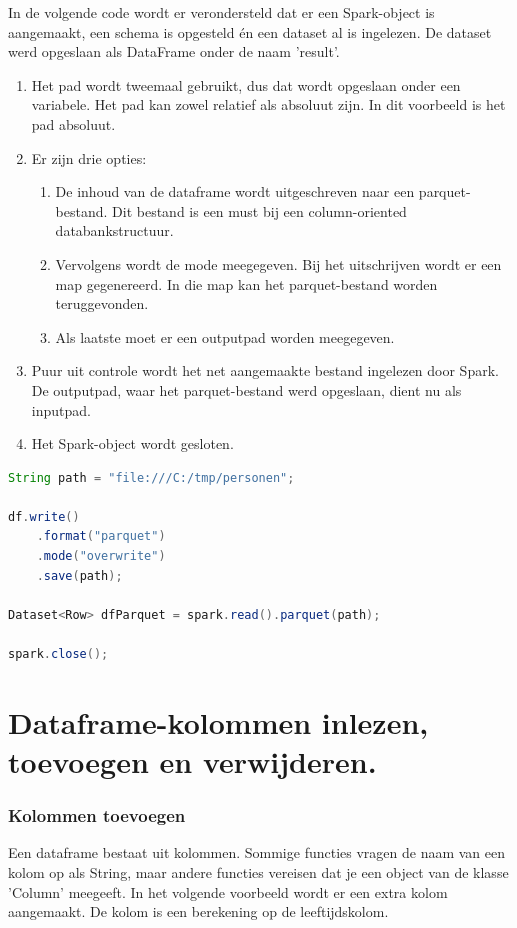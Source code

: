 \documentclass[a4paper,10pt,twoside]{report}
\begin{document}
In de volgende code wordt er verondersteld dat er een Spark-object is aangemaakt, een schema is opgesteld én een dataset al is ingelezen. De dataset werd opgeslaan als DataFrame onder de naam 'result'.

\begin{enumerate}
	\item Het pad wordt tweemaal gebruikt, dus dat wordt opgeslaan onder een variabele. Het pad kan zowel relatief als absoluut zijn. In dit voorbeeld is het pad absoluut.
	\item Er zijn drie opties:
	\begin{enumerate}
		\item De inhoud van de dataframe wordt uitgeschreven naar een parquet-bestand. Dit bestand is een must bij een column-oriented databankstructuur.
		\item Vervolgens wordt de mode meegegeven. Bij het uitschrijven wordt er een map gegenereerd. In die map kan het parquet-bestand worden teruggevonden.
		\item Als laatste moet er een outputpad worden meegegeven. 
	\end{enumerate}
	\item Puur uit controle wordt het net aangemaakte bestand ingelezen door Spark. De outputpad, waar het parquet-bestand werd opgeslaan, dient nu als inputpad.
	\item Het Spark-object wordt gesloten.
\end{enumerate}

\begin{lstlisting}[language=Java]
String path = "file:///C:/tmp/personen";

df.write()
	.format("parquet")
	.mode("overwrite")
	.save(path);
	
Dataset<Row> dfParquet = spark.read().parquet(path);

spark.close();
\end{lstlisting}

\section{Dataframe-kolommen inlezen, toevoegen en verwijderen.}

\subsubsection{Kolommen toevoegen}
Een dataframe bestaat uit kolommen. Sommige functies vragen de naam van een kolom op als String, maar andere functies vereisen dat je een object van de klasse 'Column' meegeeft. In het volgende voorbeeld wordt er een extra kolom aangemaakt. De kolom is een berekening op de leeftijdskolom. 
\end{document}
